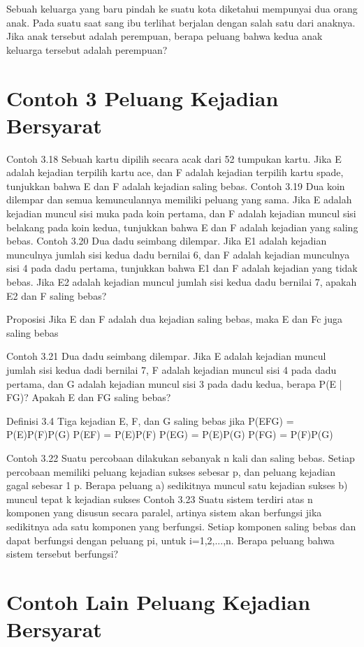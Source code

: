 \documentclass[11pt,fleqn]{book} %
\begin{document}
{{Sebuah keluarga yang baru pindah ke suatu kota diketahui mempunyai dua orang anak. Pada suatu saat sang ibu terlihat berjalan dengan salah satu dari anaknya. Jika anak tersebut adalah perempuan, berapa peluang bahwa kedua anak keluarga tersebut adalah perempuan?


\section{Contoh 3 Peluang Kejadian Bersyarat}

Contoh 3.18
Sebuah kartu dipilih secara acak dari 52 tumpukan kartu. Jika E adalah kejadian terpilih kartu ace, dan F adalah kejadian terpilih kartu spade, tunjukkan bahwa E dan F adalah kejadian saling bebas.
Contoh 3.19
Dua koin dilempar dan semua kemunculannya memiliki peluang yang sama. Jika E adalah kejadian muncul sisi muka pada koin pertama, dan F adalah kejadian muncul sisi belakang pada koin kedua, tunjukkan bahwa E dan F adalah kejadian yang saling bebas.
Contoh 3.20
Dua dadu seimbang dilempar. Jika E1 adalah kejadian munculnya jumlah sisi kedua dadu bernilai 6, dan F adalah kejadian munculnya sisi 4 pada dadu pertama, tunjukkan bahwa E1 dan F adalah kejadian yang tidak bebas. Jika E2 adalah kejadian muncul jumlah sisi kedua dadu bernilai 7, apakah E2 dan F saling bebas?

Proposisi
Jika E dan F adalah dua kejadian saling bebas, maka E dan Fc juga saling bebas

Contoh 3.21
Dua dadu seimbang dilempar. Jika E adalah kejadian muncul jumlah sisi kedua dadi bernilai 7, F adalah kejadian muncul sisi 4 pada dadu pertama, dan G adalah kejadian muncul sisi 3 pada dadu kedua, berapa P(E | FG)? Apakah E dan FG saling bebas?


Definisi 3.4
Tiga kejadian E, F, dan G saling bebas jika
P(EFG) = P(E)P(F)P(G)
P(EF) = P(E)P(F)
P(EG) = P(E)P(G)
P(FG) = P(F)P(G)

Contoh 3.22
Suatu percobaan dilakukan sebanyak n kali dan saling bebas. Setiap percobaan memiliki peluang kejadian sukses sebesar p, dan peluang kejadian gagal sebesar
1  p. Berapa peluang
a)	sedikitnya muncul satu kejadian sukses
b)	muncul tepat k kejadian sukses
Contoh 3.23
Suatu sistem terdiri atas n komponen yang disusun secara paralel, artinya sistem akan berfungsi jika sedikitnya ada satu komponen yang berfungsi. Setiap komponen saling bebas dan dapat berfungsi dengan peluang pi, untuk i=1,2,...,n.
Berapa peluang bahwa sistem tersebut berfungsi?

\section{Contoh Lain Peluang Kejadian Bersyarat}

}}
\end{document}
